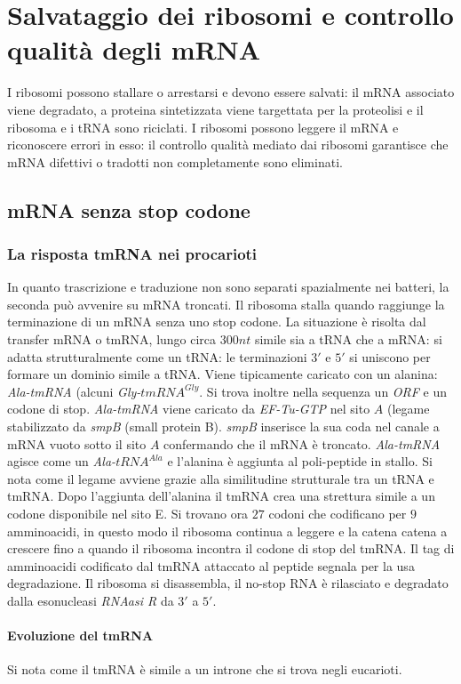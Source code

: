 \section{Salvataggio dei ribosomi e controllo qualit\`a degli mRNA}
I ribosomi possono stallare o arrestarsi e devono essere salvati: il mRNA associato viene degradato, a proteina sintetizzata viene targettata per la proteolisi e il ribosoma e i 
tRNA sono riciclati. I ribosomi possono leggere il mRNA e riconoscere errori in esso: il controllo qualit\`a mediato dai ribosomi garantisce che mRNA difettivi o tradotti non 
completamente sono eliminati. 
\subsection{mRNA senza stop codone}
\subsubsection{La risposta tmRNA nei procarioti}
In quanto trascrizione e traduzione non sono separati spazialmente nei batteri, la seconda pu\`o avvenire su mRNA troncati. Il ribosoma stalla quando raggiunge la terminazione di un 
mRNA senza uno stop codone. La situazione \`e risolta dal transfer mRNA o tmRNA, lungo circa $300nt$ simile sia a tRNA che a mRNA: si adatta strutturalmente come un tRNA: le terminazioni
$3'$ e $5'$ si uniscono per formare un dominio simile a tRNA. Viene tipicamente caricato con un alanina: \emph{Ala-tmRNA} (alcuni \emph{Gly-$tmRNA^{Gly}$}. Si trova inoltre nella
sequenza un \emph{ORF} e un codone di stop. \emph{Ala-tmRNA} viene caricato da \emph{EF-Tu-GTP} nel sito $A$ (legame stabilizzato da \emph{smpB} (small protein B). \emph{smpB} 
inserisce la sua coda nel canale a mRNA vuoto sotto il sito $A$ confermando che il mRNA \`e troncato. \emph{Ala-tmRNA} agisce come un \emph{Ala-$tRNA^{Ala}$} e l'alanina \`e aggiunta
al poli-peptide in stallo. Si nota come il legame avviene grazie alla similitudine strutturale tra un tRNA e tmRNA. Dopo l'aggiunta dell'alanina il tmRNA crea una strettura simile
a un codone disponibile nel sito E. Si trovano ora $27$ codoni che codificano per $9$ amminoacidi, in questo modo il ribosoma continua a leggere e la catena catena a crescere fino
a quando il ribosoma incontra il codone di stop del tmRNA. Il tag di amminoacidi codificato dal tmRNA attaccato al peptide segnala per la usa degradazione. Il ribosoma si disassembla, 
il no-stop RNA \`e rilasciato e degradato dalla esonucleasi \emph{RNAasi R} da $3'$ a $5'$. 
\paragraph{Evoluzione del tmRNA} 
Si nota come il tmRNA \`e simile a un introne che si trova negli eucarioti. 
